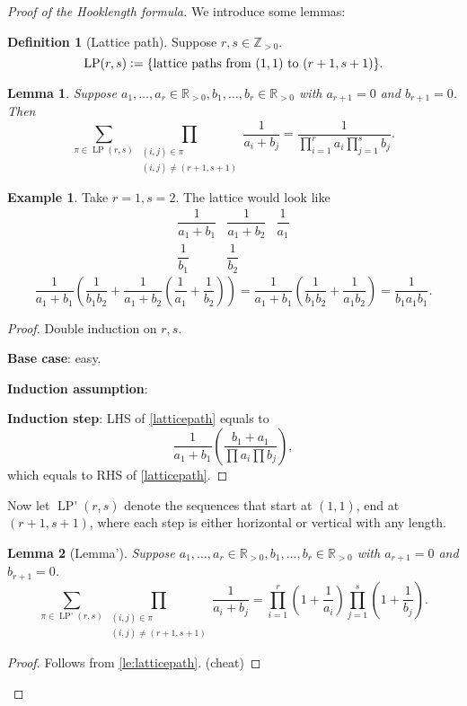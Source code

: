 \documentclass{report}
\newcommand{\R}{\mathbb{R}}
\newcommand{\Z}{\mathbb{Z}}
\newcommand{\defeq}{\vcentcolon=}
\newtheorem{lemma}{Lemma}[section]
\theoremstyle{definition}
\newtheorem{definition}{Definition}[section]
\newtheorem{example}{Example}[section]
\theoremstyle{remark}
\numberwithin{equation}{section}
\begin{document}
\begin{proof}[Proof of the Hooklength formula]
We introduce some lemmas:
\begin{definition}[Lattice path]
    Suppose $r, s \in \Z_{>0}$. \[\operatorname{LP}(r, s) \defeq \{\text{lattice paths from $(1, 1)$ to $(r + 1, s + 1)$}\}.\]
\end{definition}
\begin{lemma}\label{le:latticepath}
    Suppose $a_1, \ldots, a_r \in \R_{>0}, b_1, \ldots, b_r \in \R_{>0}$ with $a_{r + 1} = 0$ and $b_{r + 1} = 0$. Then \begin{equation}\label{latticepath}
        \sum_{\pi \in \operatorname{LP}(r, s)} \prod_{\substack{(i, j) \in \pi \\ (i, j) \neq (r+1, s+1)}} \frac{1}{a_i + b_j} = \frac{1}{\prod_{i=1}^r a_i\prod_{j=1}^s b_j}.
    \end{equation}
\end{lemma}
\begin{example}
    Take $r = 1, s = 2$. The lattice would look like \[\begin{array}{ccc}
        \dfrac{1}{a_1 + b_1} & \dfrac{1}{a_1 + b_2} & \dfrac{1}{a_1} \\[1em]
        \dfrac{1}{b_1} & \dfrac{1}{b_2} &
    \end{array}\]
    \[
        \frac{1}{a_1 + b_1}\left(\frac{1}{b_1b_2} + \frac{1}{a_1 + b_2}\left(\frac{1}{a_1} + \frac{1}{b_2}\right)\right) = \frac{1}{a_1 + b_1}\left(\frac{1}{b_1b_2} + \frac{1}{a_1b_2}\right) = \frac{1}{b_1a_1b_1}.
    \]  
\end{example}

\begin{proof} 
    Double induction on $r, s$.

    \textbf{Base case}: easy.

    \textbf{Induction assumption}:

    \textbf{Induction step}: LHS of \eqref{latticepath} equals to \[\frac{1}{a_1 + b_1}\left(\frac{b_1 + a_1}{\prod a_i \prod b_j}\right),\]
    which equals to RHS of \eqref{latticepath}.
\end{proof}

Now let $\operatorname{LP'}(r, s)$ denote the sequences that start at $(1, 1)$, end at $(r+1, s+1)$, where each step is either horizontal or vertical with any length.
   
\begin{lemma}[Lemma']
    Suppose $a_1, \ldots, a_r \in \R_{>0}, b_1, \ldots, b_r \in \R_{>0}$ with $a_{r + 1} = 0$ and $b_{r + 1} = 0$.
    \begin{equation}\label{latticepath'}
        \sum_{\pi \in \operatorname{LP'}(r, s)} \prod_{\substack{(i, j) \in \pi \\ (i, j) \neq (r+1, s+1)}} \frac{1}{a_i + b_j} = \prod_{i=1}^r \left(1 + \frac{1}{a_i}\right)\prod_{j=1}^s \left(1 + \frac{1}{b_j}\right).
    \end{equation}
\end{lemma}
\begin{proof}
    Follows from \autoref{le:latticepath}. (cheat)
\end{proof}


\end{proof}
\end{document}
